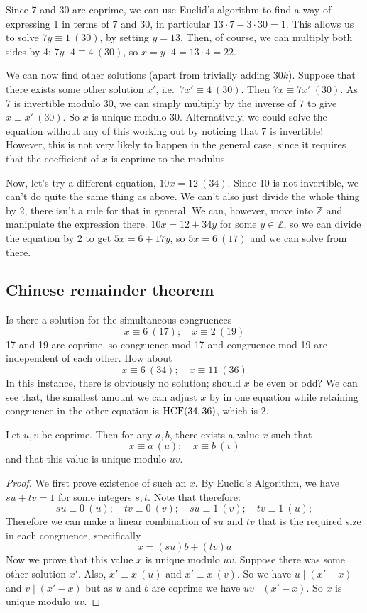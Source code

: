 Since 7 and 30 are coprime, we can use Euclid's algorithm to find a way of expressing 1 in terms of 7 and 30, in particular \(13 \cdot 7 - 3\cdot 30 = 1\).
This allows us to solve \(7y \equiv 1\ (30)\), by setting \(y=13\).
Then, of course, we can multiply both sides by 4: \(7 y\cdot 4 \equiv 4\ (30)\), so \(x = y \cdot 4 = 13 \cdot 4 = 22\).

We can now find other solutions (apart from trivially adding \(30k\)).
Suppose that there exists some other solution \(x'\), i.e.\ \(7x' \equiv 4\ (30)\).
Then \(7x \equiv 7x'\ (30)\).
As 7 is invertible modulo 30, we can simply multiply by the inverse of 7 to give \(x \equiv x'\ (30)\).
So \(x\) is unique modulo 30.
Alternatively, we could solve the equation without any of this working out by noticing that 7 is invertible!
However, this is not very likely to happen in the general case, since it requires that the coefficient of \(x\) is coprime to the modulus.

Now, let's try a different equation, \(10x = 12\ (34)\).
Since 10 is not invertible, we can't do quite the same thing as above.
We can't also just divide the whole thing by 2, there isn't a rule for that in general.
We can, however, move into \(\mathbb Z\) and manipulate the expression there.
\(10x = 12 + 34y\) for some \(y \in \mathbb Z\), so we can divide the equation by 2 to get \(5x = 6 + 17y\), so \(5x = 6\ (17)\) and we can solve from there.

\subsection{Chinese remainder theorem}
Is there a solution for the simultaneous congruences
\[
	x \equiv 6\ (17);\quad x \equiv 2\ (19)
\]
17 and 19 are coprime, so congruence mod 17 and congruence mod 19 are independent of each other.
How about
\[
	x \equiv 6\ (34);\quad x \equiv 11\ (36)
\]
In this instance, there is obviously no solution; should \(x\) be even or odd?
We can see that, the smallest amount we can adjust \(x\) by in one equation while retaining congruence in the other equation is \(\operatorname{HCF}(34, 36)\), which is 2.
\begin{theorem}
	Let \(u, v\) be coprime.
	Then for any \(a, b\), there exists a value \(x\) such that
	\[
		x \equiv a\ (u);\quad x \equiv b\ (v)
	\]
	and that this value is unique modulo \(uv\).
\end{theorem}
\begin{proof}
	We first prove existence of such an \(x\).
	By Euclid's Algorithm, we have \(su + tv = 1\) for some integers \(s, t\).
	Note that therefore:
	\[
		su \equiv 0\ (u);\quad tv \equiv 0\ (v);\quad su \equiv 1\ (v);\quad tv \equiv 1\ (u);
	\]
	Therefore we can make a linear combination of \(su\) and \(tv\) that is the required size in each congruence, specifically
	\[
		x = (su)b + (tv)a
	\]
	Now we prove that this value \(x\) is unique modulo \(uv\).
	Suppose there was some other solution \(x'\).
	Also, \(x' \equiv x\ (u)\) and \(x' \equiv x\ (v)\).
	So we have \(u\mid (x' - x)\) and \(v\mid (x' - x)\) but as \(u\) and \(b\) are coprime we have \(uv\mid (x' - x)\).
	So \(x\) is unique modulo \(uv\).
\end{proof}

